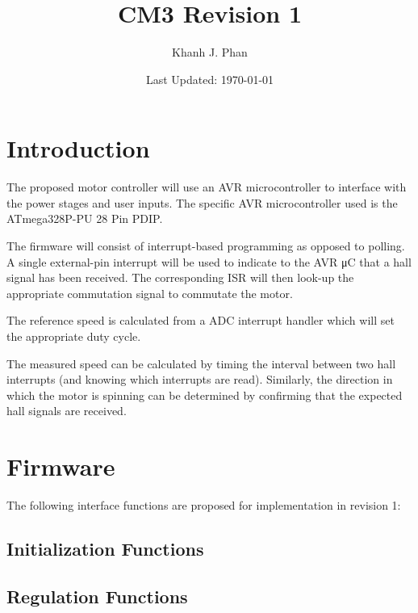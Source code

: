 \documentclass[a4paper]{article}
\title{CM3 Revision 1}
\author{Khanh J. Phan}
\date{Last Updated: \today}
\begin{document}
    \pagestyle{fancy} \lhead{} \rhead{}
    \maketitle
    \tableofcontents


\section{Introduction}
    The proposed motor controller will use an AVR microcontroller to interface with
    the power stages and user inputs. The specific AVR microcontroller used is the
    ATmega328P-PU 28 Pin PDIP.

    The firmware will consist of interrupt-based programming as opposed to polling.
    A single external-pin interrupt will be used to indicate to the AVR μC that a
    hall signal has been received. The corresponding ISR will then look-up the
    appropriate commutation signal to commutate the motor.

    The reference speed is calculated from a ADC interrupt handler which will set
    the appropriate duty cycle.

    The measured speed can be calculated by timing the interval between two hall
    interrupts (and knowing which interrupts are read). Similarly, the direction in
    which the motor is spinning can be determined by confirming that the expected
    hall signals are received.

\section{Firmware}
    The following interface functions are proposed for implementation in revision 1:

    \subsection{Initialization Functions}
    {\footnotesize}

    \subsection{Regulation Functions}
    {\footnotesize}
\end{document}

